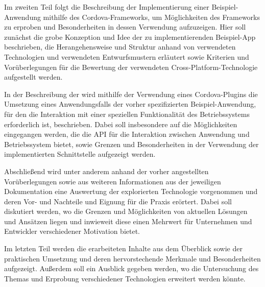  Im zweiten Teil  folgt die Beschreibung der Implementierung einer Beispiel-Anwendung mithilfe des Cordova-Frameworks, um Möglichkeiten des Frameworks zu erproben und Besonderheiten in dessen Verwendung aufzuzeigen.
	Hier soll zunächst die grobe Konzeption und Idee der zu implementierenden Beispiel-App beschrieben, die Herangehensweise und Struktur anhand von verwendeten Technologien und verwendeten Entwurfsmustern erläutert sowie Kriterien und Vorüberlegungen für die Bewertung der verwendeten Cross-Platform-Technologie aufgestellt werden.
	
	In der Beschreibung der  wird mithilfe der Verwendung eines Cordova-Plugins die Umsetzung eines Anwendungsfalls der vorher spezifizierten Beispiel-Anwendung, für den die Interaktion mit einer speziellen Funktionalität des Betriebssystems erforderlich ist, beschrieben.
	Dabei soll insbesondere auf die Möglichkeiten eingegangen werden, die die API für die Interaktion zwischen Anwendung und Betriebssystem bietet, sowie Grenzen und Besonderheiten in der Verwendung der implementierten Schnittstelle aufgezeigt werden.

	Abschließend wird unter anderem anhand der vorher angestellten Vorüberlegungen sowie aus weiteren Informationen aus der jeweiligen Dokumentation eine Auswertung der explorierten Technologie vorgenommen und deren Vor- und Nachteile und Eignung für die Praxis erörtert.
	Dabei soll diskutiert werden, wo die Grenzen und Möglichkeiten von aktuellen Lösungen und Ansätzen liegen und inwieweit diese einen Mehrwert für Unternehmen und Entwickler verschiedener Motivation bietet.

Im letzten Teil  werden die erarbeiteten Inhalte aus dem Überblick sowie der praktischen Umsetzung und deren hervorstechende Merkmale und Besonderheiten aufgezeigt. Außerdem soll ein Ausblick gegeben werden, wo die Untersuchung des Themas und Erprobung verschiedener Technologien erweitert werden könnte.
